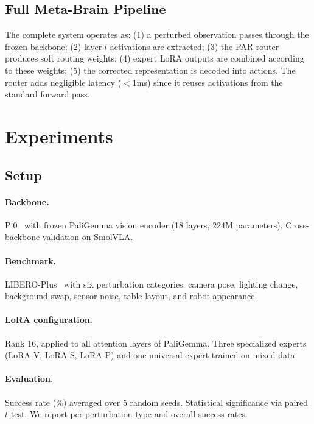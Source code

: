\documentclass[letterpaper]{article}
\newcommand{\ours}{Meta-Brain}
\newcommand{\libeplus}{LIBERO-Plus}
\begin{document}
\subsection{Full \ours{} Pipeline}
\label{sec:pipeline}

The complete system operates as: (1) a perturbed observation passes through the frozen backbone; (2) layer-$l$ activations are extracted; (3) the PAR router produces soft routing weights; (4) expert LoRA outputs are combined according to these weights; (5) the corrected representation is decoded into actions.
The router adds negligible latency ($<$1ms) since it reuses activations from the standard forward pass.

\section{Experiments}
\label{sec:experiments}

\subsection{Setup}
\label{sec:setup}

\paragraph{Backbone.} Pi0~\cite{black2024pi0} with frozen PaliGemma vision encoder (18 layers, 224M parameters).
Cross-backbone validation on SmolVLA.

\paragraph{Benchmark.} \libeplus{}~\cite{zhou2025liberoplus} with six perturbation categories: camera pose, lighting change, background swap, sensor noise, table layout, and robot appearance.

\paragraph{LoRA configuration.} Rank 16, applied to all attention layers of PaliGemma.
Three specialized experts (LoRA-V, LoRA-S, LoRA-P) and one universal expert trained on mixed data.

\paragraph{Evaluation.} Success rate (\%) averaged over 5 random seeds.
Statistical significance via paired $t$-test.
We report per-perturbation-type and overall success rates.
\end{document}
